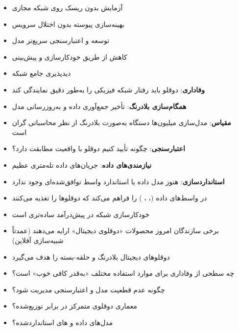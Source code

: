 
\begin{itemize}
\tightlist
\item
  آزمایش بدون ریسک روی شبکه مجازی
\item
  بهینه‌سازی پیوسته بدون اختلال سرویس
\item
  توسعه و اعتبارسنجی سریع‌تر مدل 
\item
  کاهش  از طریق خودکارسازی و پیش‌بینی
\item
  دیدپذیری جامع شبکه
\end{itemize}


\begin{itemize}
\tightlist
\item
  \textbf{وفاداری}: دوقلو باید رفتار شبکه فیزیکی را به‌طور دقیق نمایندگی کند
\item
  \textbf{همگام‌سازی بلادرنگ}: تأخیر جمع‌آوری داده و به‌روزرسانی مدل
\item
  \textbf{مقیاس}: مدل‌سازی میلیون‌ها دستگاه به‌صورت بلادرنگ از نظر محاسباتی گران است
\item
  \textbf{اعتبارسنجی}: چگونه تأیید کنیم دوقلو با واقعیت مطابقت دارد؟
\item
  \textbf{نیازمندی‌های داده}: جریان‌های داده تله‌متری عظیم
\item
  \textbf{استانداردسازی}: هنوز مدل داده یا استاندارد واسط توافق‌شده‌ای وجود ندارد
\end{itemize}


\begin{itemize}
\tightlist
\item
   در  واسط‌های داده (، ، ) را فراهم می‌کند که دوقلوها را تغذیه می‌کنند
\item
  خودکارسازی شبکه در  پیش‌درآمد ساده‌تری است
\item
  برخی سازندگان امروز محصولات «دوقلوی دیجیتال» ارایه می‌دهند (عمدتاً شبیه‌سازی آفلاین)
\item
   دوقلوهای دیجیتال بلادرنگ و حلقه-بسته را هدف می‌گیرد
\end{itemize}


\begin{itemize}
\tightlist
\item
  چه سطحی از وفاداری برای موارد استفاده مختلف «به‌قدر کافی خوب» است؟
\item
  چگونه عدم قطعیت مدل و اعتبارسنجی مدیریت شود؟
\item
  معماری دوقلوی متمرکز در برابر توزیع‌شده؟
\item
  مدل‌های داده و های استانداردشده؟
\end{itemize}

